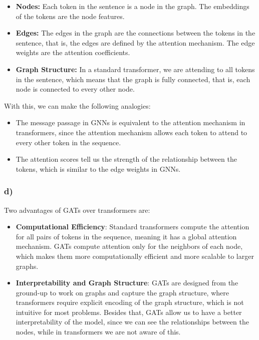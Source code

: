 \documentclass{article}
\begin{document}
\begin{itemize}
    \item \textbf{Nodes:} Each token in the sentence is a node in the graph. The embeddings of the tokens are the node features.
    \item \textbf{Edges:} The edges in the graph are the connections between the tokens in the sentence, that is, the edges are defined by the attention mechanism.
The edge weights are the attention coefficients.
    \item \textbf{Graph Structure:} In a standard transformer, we are attending to all tokens in the sentence, which means that the graph is fully connected, that is,
each node is connected to every other node.
\end{itemize}

With this, we can make the following analogies:

\begin{itemize}
    \item The message passage in GNNs is equivalent to the attention mechanism in transformers, since the attention mechanism allows each token to attend to every other token in the sequence.
    \item The attention scores tell us the strength of the relationship between the tokens, which is similar to the edge weights in GNNs.
\end{itemize}

\subsubsection*{d)}

Two advantages of GATs over transformers are:

\begin{itemize}
    \item \textbf{Computational Efficiency}: Standard transformers compute the attention for all pairs of tokens in the sequence, meaning it has a global attention mechanism.
GATs compute attention only for the neighbors of each node, which makes them more computationally efficient and more scalable to larger graphs.
    \item \textbf{Interpretability and Graph Structure}: GATs are designed from the ground-up to work on graphs and capture the graph structure, where transformers require explicit encoding of the graph structure,
which is not intuitive for most problems. Besides that, GATs allow us to have a better interpretability of the model, since we can see the relationships between the nodes, while in transformers
we are not aware of this. 
\end{itemize}






























\newpage

 
\end{document}
